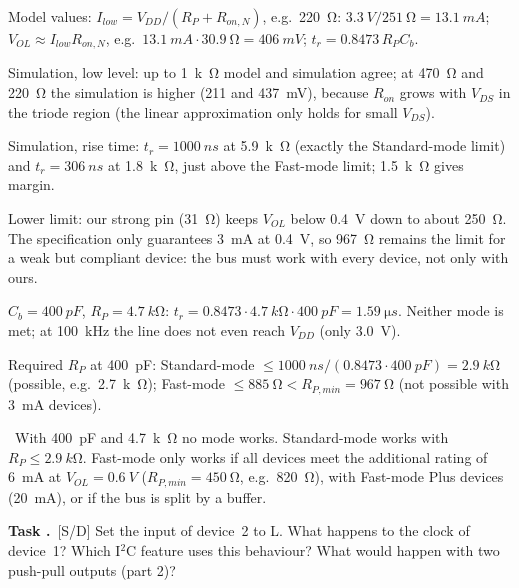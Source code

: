 \documentclass[a4paper,11pt]{article}
\newcounter{task}[section]
\renewcommand{\thetask}{\thesection.\arabic{task}}
\newcommand{\task}[1]{\par\medskip\refstepcounter{task}%
  {\sffamily\bfseries\color{rwuviolet}Task \thetask}\ {\sffamily\small\color{rwucyandark}[#1]}\quad}
\newenvironment{solution}{\begin{solbox}}{\end{solbox}}
\newcommand{\answer}{\par\smallskip{\sffamily\bfseries\color{rwuviolet}Answer:}\ }
\begin{document}
\begin{solution}
\begin{steps}
  \item Model values: $I_{low}=V_{DD}/(R_P+R_{on,N})$, e.g.\ \SI{220}{\ohm}:
        $\SI{3.3}{V}/\SI{251}{\ohm}=\SI{13.1}{mA}$; $V_{OL}\approx I_{low}R_{on,N}$, e.g.\
        $\SI{13.1}{mA}\cdot\SI{30.9}{\ohm}=\SI{406}{mV}$; $t_r=0.8473\,R_PC_b$.
  \item Simulation, low level: up to \SI{1}{k\ohm} model and simulation agree; at \SI{470}{\ohm} and
        \SI{220}{\ohm} the simulation is higher (211 and \SI{437}{mV}), because $R_{on}$ grows with $V_{DS}$ in
        the triode region (the linear approximation only holds for small $V_{DS}$).
  \item Simulation, rise time: $t_r=\SI{1000}{ns}$ at \SI{5.9}{k\ohm} (exactly the Standard-mode limit) and
        $t_r=\SI{306}{ns}$ at \SI{1.8}{k\ohm}, just above the Fast-mode limit; \SI{1.5}{k\ohm} gives margin.
  \item Lower limit: our strong pin (\SI{31}{\ohm}) keeps $V_{OL}$ below \SI{0.4}{V} down to about
        \SI{250}{\ohm}. The specification only guarantees \SI{3}{mA} at \SI{0.4}{V}, so \SI{967}{\ohm} remains
        the limit for a weak but compliant device: the bus must work with every device, not only with ours.
  \item $C_b=\SI{400}{pF}$, $R_P=\SI{4.7}{k\ohm}$: $t_r=0.8473\cdot\SI{4.7}{k\ohm}\cdot\SI{400}{pF}=\SI{1.59}{\micro s}$.
        Neither mode is met; at \SI{100}{kHz} the line does not even reach $V_{DD}$ (only \SI{3.0}{V}).
  \item Required $R_P$ at \SI{400}{pF}: Standard-mode $\le\SI{1000}{ns}/(0.8473\cdot\SI{400}{pF})=\SI{2.9}{k\ohm}$
        (possible, e.g.\ \SI{2.7}{k\ohm}); Fast-mode $\le\SI{885}{\ohm}<R_{P,min}=\SI{967}{\ohm}$ (not possible
        with \SI{3}{mA} devices).
\end{steps}
\answer With \SI{400}{pF} and \SI{4.7}{k\ohm} no mode works. Standard-mode works with $R_P\le\SI{2.9}{k\ohm}$.
Fast-mode only works if all devices meet the additional rating of \SI{6}{mA} at $V_{OL}=\SI{0.6}{V}$
($R_{P,min}=\SI{450}{\ohm}$, e.g.\ \SI{820}{\ohm}), with Fast-mode Plus devices (\SI{20}{mA}), or if the bus is
split by a buffer.
\end{solution}

\task{S/D} Set the input of device~2 to \textsf{L}. What happens to the clock of device~1? Which I$^2$C feature
uses this behaviour? What would happen with two push-pull outputs (part 2)?
\end{document}
